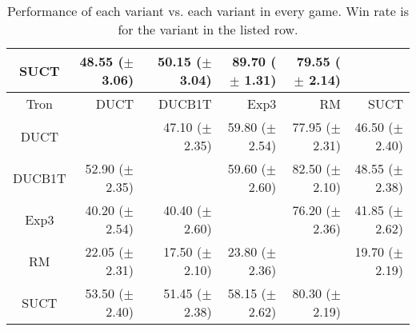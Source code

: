 \documentclass{article}
\begin{document}
\begin{table}
\begin{center}
\begin{tabular}{|c|rrrrr|}
           SUCT    & 48.55 ($\pm$ 3.06)   & 50.15 ($\pm$ 3.04)   & 89.70 ($\pm$ 1.31)   & 79.55 ($\pm$ 2.14)   &              \\
\hline
\hline
           Tron   &       DUCT   &     DUCB1T   &       Exp3   &         RM   &       SUCT   \\
\hline
           DUCT    &              & 47.10 ($\pm$ 2.35)   & 59.80 ($\pm$ 2.54)   & 77.95 ($\pm$ 2.31)   & 46.50 ($\pm$ 2.40)   \\
         DUCB1T    & 52.90 ($\pm$ 2.35)   &              & 59.60 ($\pm$ 2.60)   & 82.50 ($\pm$ 2.10)   & 48.55 ($\pm$ 2.38)   \\
           Exp3    & 40.20 ($\pm$ 2.54)   & 40.40 ($\pm$ 2.60)   &              & 76.20 ($\pm$ 2.36)   & 41.85 ($\pm$ 2.62)   \\
             RM    & 22.05 ($\pm$ 2.31)   & 17.50 ($\pm$ 2.10)   & 23.80 ($\pm$ 2.36)   &              & 19.70 ($\pm$ 2.19)   \\
           SUCT    & 53.50 ($\pm$ 2.40)   & 51.45 ($\pm$ 2.38)   & 58.15 ($\pm$ 2.62)   & 80.30 ($\pm$ 2.19)   &              \\
\hline
\end{tabular}
\end{center}
\caption{Performance of each variant vs. each variant in every game. Win rate is for the variant in the listed row. \label{tbl:cross}}
\end{table}
\end{document}
